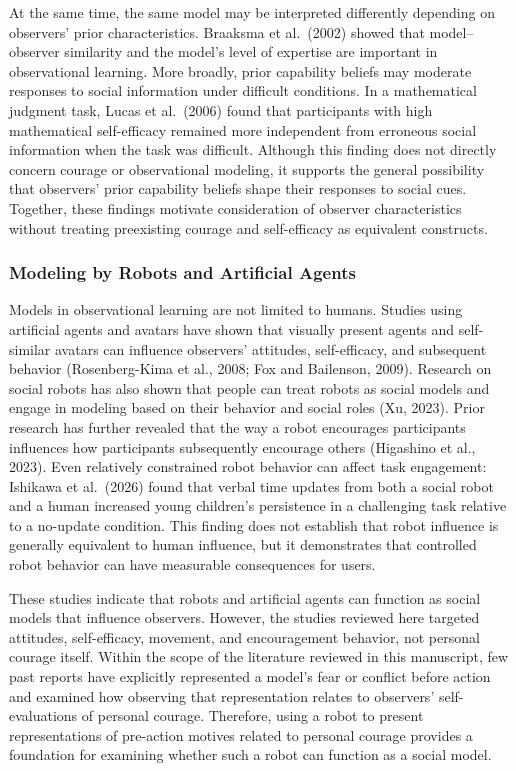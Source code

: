 At the same time, the same model may be interpreted differently
depending on observers' prior characteristics. Braaksma et al.~(2002)
showed that model--observer similarity and the model's level of
expertise are important in observational learning. More broadly, prior
capability beliefs may moderate responses to social information under
difficult conditions. In a mathematical judgment task, Lucas et
al.~(2006) found that participants with high mathematical self-efficacy
remained more independent from erroneous social information when the
task was difficult. Although this finding does not directly concern
courage or observational modeling, it supports the general possibility
that observers' prior capability beliefs shape their responses to social
cues. Together, these findings motivate consideration of observer
characteristics without treating preexisting courage and self-efficacy
as equivalent constructs.

\subsubsection{Modeling by Robots and Artificial
Agents}\label{modeling-by-robots-and-artificial-agents}

Models in observational learning are not limited to humans. Studies
using artificial agents and avatars have shown that visually present
agents and self-similar avatars can influence observers' attitudes,
self-efficacy, and subsequent behavior (Rosenberg-Kima et al., 2008; Fox
and Bailenson, 2009). Research on social robots has also shown that
people can treat robots as social models and engage in modeling based on
their behavior and social roles (Xu, 2023). Prior research has further
revealed that the way a robot encourages participants influences how
participants subsequently encourage others (Higashino et al., 2023).
Even relatively constrained robot behavior can affect task engagement:
Ishikawa et al.~(2026) found that verbal time updates from both a social
robot and a human increased young children's persistence in a
challenging task relative to a no-update condition. This finding does
not establish that robot influence is generally equivalent to human
influence, but it demonstrates that controlled robot behavior can have
measurable consequences for users.

These studies indicate that robots and artificial agents can function as
social models that influence observers. However, the studies reviewed
here targeted attitudes, self-efficacy, movement, and encouragement
behavior, not personal courage itself. Within the scope of the
literature reviewed in this manuscript, few past reports have explicitly
represented a model's fear or conflict before action and examined how
observing that representation relates to observers' self-evaluations of
personal courage. Therefore, using a robot to present representations of
pre-action motives related to personal courage provides a foundation for
examining whether such a robot can function as a social model.

